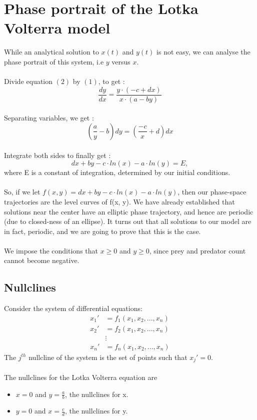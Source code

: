\documentclass{article}
\begin{document}
\section{Phase portrait of the Lotka Volterra model}

While an analytical solution to $x(t)$ and $y(t)$ is not easy, we can analyse the phase portrait of this system, i.e $y$ versus $x$.
\\
\\
Divide equation $(2)$ by $(1)$, to get :
$$\frac{dy}{dx} = \frac{y \cdot (-c + dx)}{x \cdot (a - by)}$$
\\
Separating variables, we get :
$$\left (\frac{a}{y} - b \right)dy = \left(\frac{-c}{x} + d \right)dx$$
\\
Integrate both sides to finally get : 
$$dx + by - c\cdot ln(x) - a\cdot ln(y) = E,$$
where E is a constant of integration, determined by our initial conditions.
\\
\\
So, if we let $f(x, y) = dx + by - c\cdot ln(x) - a\cdot ln(y)$, then our phase-space trajectories are the level curves of f(x, y). We have already established that solutions near the center have an elliptic phase trajectory, and hence are periodic (due to closed-ness of an ellipse). It turns out that all solutions to our model are in fact, periodic, and we are going to prove that this is the case.
\\
\\
We impose the conditions that $x \geq 0$ and $y \geq 0$, since prey and predator count cannot become negative.
\subsection{Nullclines}
Consider the system of differential equations:
\begin{align*}
   x_1' &= f_1(x_1, x_2, ..., x_n)\\
   x_2' &= f_2(x_1, x_2, ..., x_n)\\
   &\vdots \\
   x_n' &= f_n(x_1, x_2, ..., x_n)
\end{align*}
The $j^{th}$ nullcline of the system is the set of points such that $x_j' = 0$.
\\
\\
The nullclines for the Lotka Volterra equation are
\begin{itemize}
    \item $x = 0$ and $y = \frac{a}{b}$, the nullclines for x.
    \item $y = 0$ and $x = \frac{c}{d}$, the nullclines for y.
\end{itemize}
\end{document}
